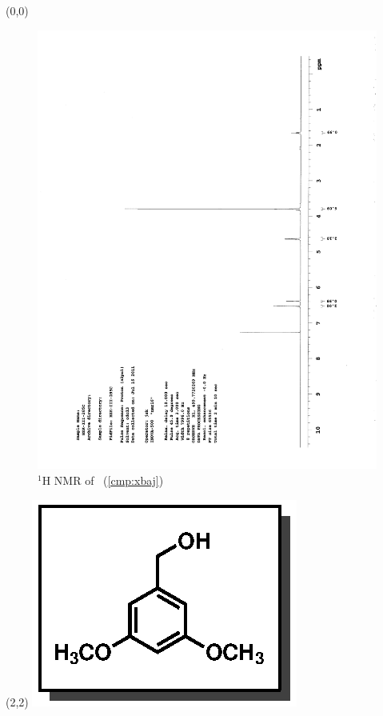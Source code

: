 \begin{textblock}{20}(0,0)
\begin{figure}[htb]
\caption{$^1$H NMR of \CMPxbaj\ (\ref{cmp:xbaj})}
\includegraphics[scale=0.75, trim = 0mm 0mm 0mm 5mm,
clip]{chp_singlecarbon/images/nmr/xbajH}
\vspace{-100pt}
\end{figure}
\end{textblock}
\begin{textblock}{1}(2,2)
\includegraphics[scale=0.8, angle=90]{chp_singlecarbon/images/xbaj}
\end{textblock}
